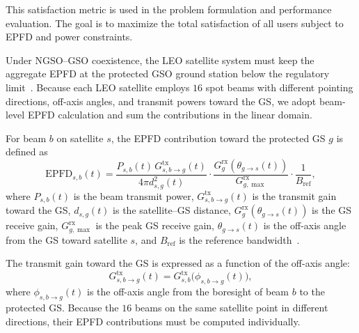 This satisfaction metric is used in the problem formulation and performance evaluation. The goal is to maximize the total satisfaction of all users subject to EPFD and power constraints.

Under NGSO--GSO coexistence, the LEO satellite system must keep the aggregate EPFD at the protected GSO ground station below the regulatory limit~\cite{itur_rr2020,itur_s1503_2018}. Because each LEO satellite employs $16$ spot beams with different pointing directions, off-axis angles, and transmit powers toward the GS, we adopt beam-level EPFD calculation and sum the contributions in the linear domain.

For beam $b$ on satellite $s$, the EPFD contribution toward the protected GS $g$ is defined as
\begin{equation*}
\mathrm{EPFD}_{s,b}(t)=
\frac{P_{s,b}(t)\,G^{\mathrm{tx}}_{s,b\to g}(t)}
{4\pi d_{s,g}^{2}(t)}
\cdot
\frac{G_g^{\mathrm{rx}}(\theta_{g\to s}(t))}
{G_{g,\max}^{\mathrm{rx}}}
\cdot
\frac{1}{B_{\mathrm{ref}}},
\end{equation*}
where $P_{s,b}(t)$ is the beam transmit power, $G^{\mathrm{tx}}_{s,b\to g}(t)$ is the transmit gain toward the GS, $d_{s,g}(t)$ is the satellite--GS distance, $G_g^{\mathrm{rx}}(\theta_{g\to s}(t))$ is the GS receive gain, $G_{g,\max}^{\mathrm{rx}}$ is the peak GS receive gain, $\theta_{g\to s}(t)$ is the off-axis angle from the GS toward satellite $s$, and $B_{\mathrm{ref}}$ is the reference bandwidth~\cite{itur_s1528_2001,itur_s1428_2001}.

The transmit gain toward the GS is expressed as a function of the off-axis angle:
\begin{equation*}
G^{\mathrm{tx}}_{s,b\to g}(t)=G^{\mathrm{tx}}_{s,b}\!\bigl(\phi_{s,b\to g}(t)\bigr),
\end{equation*}
where $\phi_{s,b\to g}(t)$ is the off-axis angle from the boresight of beam $b$ to the protected GS. Because the $16$ beams on the same satellite point in different directions, their EPFD contributions must be computed individually.

